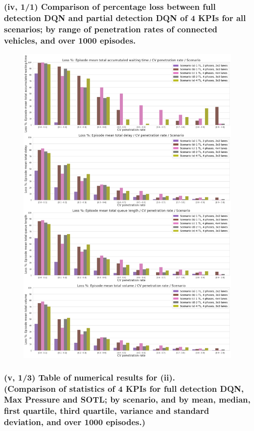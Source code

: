 \subsubsection*{(iv, 1/1) Comparison of percentage loss between full detection DQN and partial detection DQN of 4 KPIs for all scenarios; by range of penetration rates of connected vehicles, and over 1000 episodes.}
\restoregeometry

\pagebreak

\begin{figure}[h]
\includegraphics[width=\textwidth]{img/Appendix/4.png}
\centering
\end{figure}
\restoregeometry

\pagebreak

\subsubsection*{(v, 1/3) Table of numerical results for (ii). \\
(Comparison of statistics of 4 KPIs for full detection DQN, Max Pressure and SOTL; by scenario, and by mean, median, first quartile, third quartile, variance and standard deviation, and over 1000 episodes.)}

